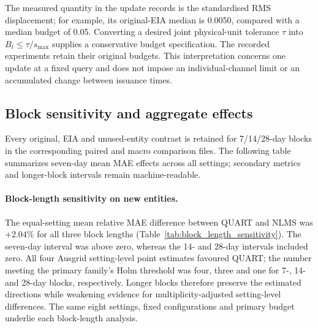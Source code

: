 \documentclass[11pt,a4paper]{article}
\begin{document}
The measured quantity in the update records is the standardised RMS displacement; for example, its original-EIA median is 0.0050, compared with a median budget of 0.05. Converting a desired joint physical-unit tolerance $\tau$ into $B_t\leq\tau/s_{\max}$ supplies a conservative budget specification. The recorded experiments retain their original budgets. This interpretation concerns one update at a fixed query and does not impose an individual-channel limit or an accumulated change between issuance times.
\FloatBarrier

\subsection{Block sensitivity and aggregate effects}
Every original, EIA and unused-entity contrast is retained for 7/14/28-day blocks in the corresponding paired and macro comparison files. The following table summarizes seven-day mean MAE effects across all settings; secondary metrics and longer-block intervals remain machine-readable.
{\footnotesize}

\paragraph{Block-length sensitivity on new entities.}
The equal-setting mean relative MAE difference between QUART and NLMS was $+2.04\%$ for all three block lengths (Table~\ref{tab:block_length_sensitivity}). The seven-day interval was above zero, whereas the 14- and 28-day intervals included zero. All four Ausgrid setting-level point estimates favoured QUART; the number meeting the primary family's Holm threshold was four, three and one for 7-, 14- and 28-day blocks, respectively. Longer blocks therefore preserve the estimated directions while weakening evidence for multiplicity-adjusted setting-level differences. The same eight settings, fixed configurations and primary budget underlie each block-length analysis.

\begin{table}[htbp]
\centering\small
\caption{New-entity QUART--NLMS mean relative MAE difference under all recorded block lengths. The same eight settings receive equal weights. Brackets give pointwise paired 95\% intervals conditional on the evaluated cohorts, fixed sources and recorded adaptation trajectories; these macro intervals are not multiplicity-adjusted setting-level tests.}
\label{tab:block_length_sensitivity}

\end{table}
\FloatBarrier
\end{document}
